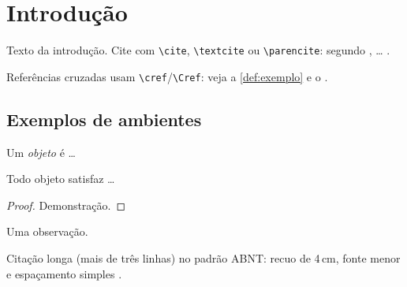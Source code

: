 
\chapter{Introdução}
\label{cap:introducao}

Texto da introdução. Cite com \verb|\cite|, \verb|\textcite| ou
\verb|\parencite|: segundo \textcite{doCarmo1992}, \ldots{} \parencite{lima1973variedades}.

Referências cruzadas usam \verb|\cref|/\verb|\Cref|: veja a
\cref{def:exemplo} e o .

\section{Exemplos de ambientes}

\begin{definition}
  \label{def:exemplo}
  Um \emph{objeto} é \ldots
\end{definition}

\begin{theorem}
  \label{teo:exemplo}
  Todo objeto satisfaz \ldots
\end{theorem}

\begin{proof}
  Demonstração.
\end{proof}

\begin{observation}
  Uma observação.
\end{observation}

\begin{citacao}
  Citação longa (mais de três linhas) no padrão ABNT: recuo de 4\,cm,
  fonte menor e espaçamento simples \parencite[p.~1]{doCarmo1992}.
\end{citacao}
